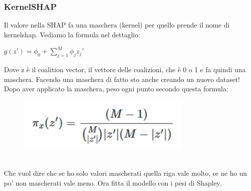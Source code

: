 \subsubsection{KernelSHAP}
Il valore nella SHAP fa una maschera (kernel) per quello prende il nome di kernelshap. Vediamo la formula nel dettaglio:
\begin{center}
    \begin{math}
        g(z') = \phi_0 + \sum_{j=1}^{M} \phi_j z_j'
    \end{math}
\end{center}
Dove z è il coalition vector, il vettore delle coalizioni, che è 0 o 1 e fa quindi una maschera. Facendo una maschera di fatto sto anche creando un nuovo dataset!
\\
Dopo aver applicato la maschera, peso ogni punto secondo questa formula: 
\\
\begin{figure}[th]
    \centering
    \includegraphics[scale=0.6]{ExplainableAI/img/weights.png}
\end{figure}
\\
Che vuol dire che se ho solo valori mascherati quella riga vale molto, se ne ho un po' non mascherati vale meno. Ora fitta il modello con i pesi di Shapley. 


